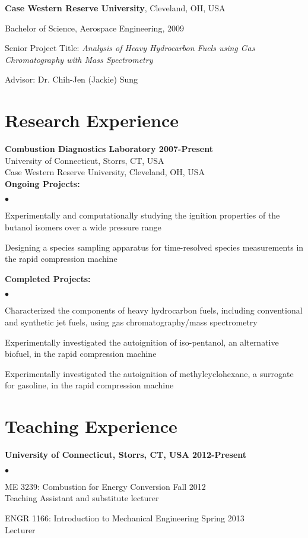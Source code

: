 \documentclass[margin,line]{res}
\newenvironment{list1}{
  \begin{list}{\ding{113}}{%
      \setlength{\itemsep}{0in}
      \setlength{\parsep}{0in} \setlength{\parskip}{0in}
      \setlength{\topsep}{0in} \setlength{\partopsep}{0in} 
      \setlength{\leftmargin}{0.17in}}}{\end{list}}
\newenvironment{list2}{
  \begin{list}{$\bullet$}{%
      \setlength{\itemsep}{0.05in}
      \setlength{\parsep}{0in} \setlength{\parskip}{0in}
      \setlength{\topsep}{0in} \setlength{\partopsep}{0in} 
      \setlength{\leftmargin}{0.2in}}}{\end{list}}
\begin{document}
\begin{resume}
{\bf Case Western Reserve University}, Cleveland, OH, USA
\begin{list1}
\item[] Bachelor of Science, Aerospace Engineering, 2009
\item[] Senior Project Title: \emph{Analysis of Heavy Hydrocarbon Fuels using Gas Chromatography with Mass Spectrometry}
\item[] Advisor: Dr. Chih-Jen (Jackie) Sung
\end{list1}

\section{\sc Research Experience}
{\bf \large{Combustion Diagnostics Laboratory \hfill 2007-Present}}\\
University of Connecticut, Storrs, CT, USA\\
Case Western Reserve University, Cleveland, OH, USA\\
{\bf Ongoing Projects:}
\begin{list2}
\item Experimentally and computationally studying the ignition properties of the butanol isomers over a wide pressure range
\item Designing a species sampling apparatus for time-resolved species measurements in the rapid compression machine
\end{list2}
{\bf Completed Projects:}
\begin{list2}
\item Characterized the components of heavy hydrocarbon fuels, including conventional and synthetic jet fuels, using gas chromatography/mass spectrometry
\item Experimentally investigated the autoignition of iso-pentanol, an alternative biofuel, in the rapid compression machine
\item Experimentally investigated the autoignition of methylcyclohexane, a surrogate for gasoline, in the rapid compression machine
\end{list2}

\section{\sc Teaching Experience}
{\bf \large{University of Connecticut, Storrs, CT, USA} \hfill 2012-Present}\\
\begin{list2}
\item ME 3239: Combustion for Energy Conversion \hfill Fall 2012\\
Teaching Assistant and substitute lecturer
\item ENGR 1166: Introduction to Mechanical Engineering \hfill Spring 2013\\
Lecturer
\end{list2}


\end{resume}
\end{document}
